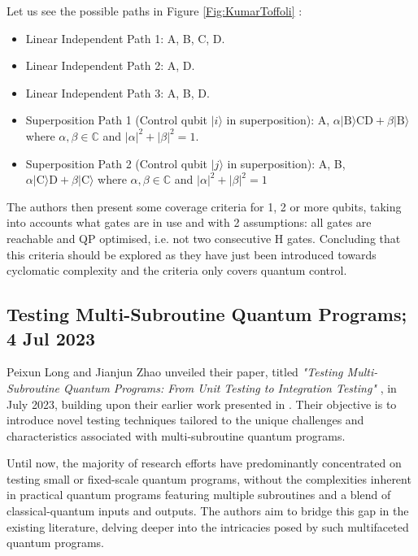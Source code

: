 \begin{itemize}
Let us see the possible paths in Figure \ref{Fig:KumarToffoli} :
\begin{itemize}
    \item Linear Independent Path 1: A, B, C, D.
    \item Linear Independent Path 2: A, D.
    \item Linear Independent Path 3: A, B, D.
    \item Superposition Path 1 (Control qubit $|i\rangle$ in superposition): A, $\alpha|\text{B}\rangle\text{CD}+\beta|\text{B}\rangle$ where $\alpha,\beta \in \mathbb{C}$ and $|\alpha|^{2}+|\beta|^{2}=1$.
    \item Superposition Path 2 (Control qubit $|j\rangle$ in superposition): A, B, $\alpha|\text{C}\rangle\text{D}+\beta|\text{C}\rangle$ where $\alpha,\beta \in \mathbb{C}$ and $|\alpha|^{2}+|\beta|^{2}=1$
\end{itemize}

The authors then present some coverage criteria for 1, 2 or more qubits, taking into accounts what gates are in use and with 2 assumptions: all gates are reachable and QP optimised, i.e. not two consecutive H gates. Concluding that this criteria should be explored as they have just been introduced towards cyclomatic complexity and the criteria only covers quantum control.

\vspace{15pt}
\subsection{Testing Multi-Subroutine Quantum Programs; 4 Jul 2023}

Peixun Long and Jianjun Zhao unveiled their paper, titled \textit{"Testing Multi-Subroutine Quantum Programs: From Unit Testing to Integration Testing"} \cite{long2023equivalence}, in July 2023, building upon their earlier work presented in \cite{long2023testing}. Their objective is to introduce novel testing techniques tailored to the unique challenges and characteristics associated with multi-subroutine quantum programs.\newline

Until now, the majority of research efforts have predominantly concentrated on testing small or fixed-scale quantum programs, without the complexities inherent in practical quantum programs featuring multiple subroutines and a blend of classical-quantum inputs and outputs. The authors aim to bridge this gap in the existing literature, delving deeper into the intricacies posed by such multifaceted quantum programs.\newline


\end{itemize}
